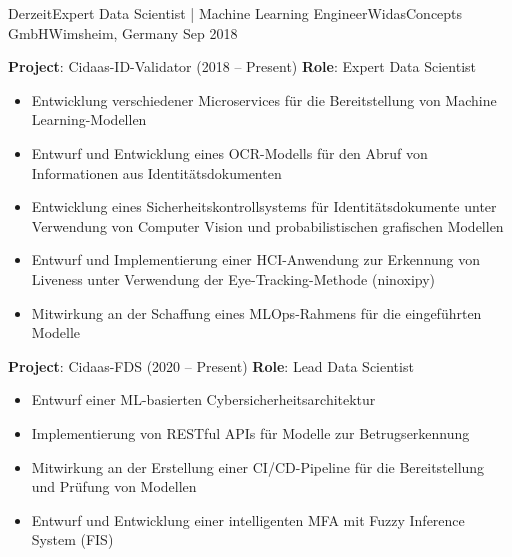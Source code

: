 %
%
%
\begin{experiences}
  \experience
  {Derzeit}{Expert Data Scientist | Machine Learning Engineer}{WidasConcepts GmbH}{Wimsheim, Germany}
  {Sep 2018} {
    \vspace{0.1cm}
    \textbf{Project}: Cidaas-ID-Validator (2018 -- Present) \newline
    \textbf{Role}: Expert Data Scientist
    \begin{itemize}
      \item Entwicklung verschiedener Microservices für die Bereitstellung von Machine Learning-Modellen
      \item Entwurf und Entwicklung eines OCR-Modells für den Abruf von Informationen aus Identitätsdokumenten
      \item Entwicklung eines Sicherheitskontrollsystems für Identitätsdokumente unter Verwendung von Computer Vision und probabilistischen grafischen Modellen
      \item Entwurf und Implementierung einer HCI-Anwendung zur Erkennung von Liveness unter Verwendung der Eye-Tracking-Methode (ninoxipy)
      \item Mitwirkung an der Schaffung eines MLOps-Rahmens für die eingeführten Modelle
    \end{itemize}
    \vspace{0.1cm}
    \textbf{Project}: Cidaas-FDS (2020 -- Present)\newline
    \textbf{Role}: Lead Data Scientist
    \begin{itemize}
      \item Entwurf einer ML-basierten Cybersicherheitsarchitektur
      \item Implementierung von RESTful APIs für Modelle zur Betrugserkennung
      \item Mitwirkung an der Erstellung einer CI/CD-Pipeline für die Bereitstellung und Prüfung von Modellen
      \item Entwurf und Entwicklung einer intelligenten MFA mit Fuzzy Inference System (FIS)
    \end{itemize}
    \vspace{0.1cm}

}
\end{experiences}
